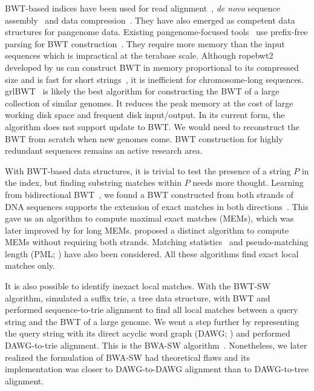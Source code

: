 \documentclass[webpdf,contemporary,large,namedate]{oup-authoring-template}%
\begin{document}
BWT-based indices have been used for read alignment~\citep{Langmead:2009aa,Li:2009uq,Li:2009aa},
\emph{de novo} sequence assembly~\citep{Simpson:2012aa} and data compression~\citep{Cox:2012ly}.
They have also emerged as competent data structures for pangenome data.
Existing pangenome-focused tools~\citep{Rossi:2022aa,Ahmed:2021aa,Zakeri:2024aa}
use prefix-free parsing for BWT construction~\citep{Boucher:2019aa}.
They require more memory than the input sequences which is impractical at the terabase scale.
Although ropebwt2 developed by us can construct BWT in memory proportional to its compressed size and is fast for short strings~\citep{Li:2014ab},
it is inefficient for chromosome-long sequences.
grlBWT~\citep{DBLP:journals/iandc/DiazDominguezN23} is likely the best algorithm for constructing the BWT of a large collection of similar genomes.
It reduces the peak memory at the cost of large working disk space and frequent disk input/output.
In its current form, the algorithm does not support update to BWT.
We would need to reconstruct the BWT from scratch when new genomes come.
BWT construction for highly redundant sequences remains an active research area.

With BWT-based data structures, it is trivial to test the presence of a string $P$ in the index,
but finding substring matches within $P$ needs more thought.
Learning from bidirectional BWT~\citep{DBLP:conf/bibm/LamLTWWY09},
we found a BWT constructed from both strands of DNA sequences supports the extension of exact matches in both directions~\citep{Li:2012fk}.
This gave us an algorithm to compute maximal exact matches (MEMs), which was later improved by \citet{DBLP:conf/dlt/Gagie24} for long MEMs.
\citet{DBLP:journals/tcs/BannaiGI20} proposed a distinct algorithm to compute MEMs without requiring both strands.
Matching statistics~\citep{DBLP:journals/algorithmica/ChangL94} and pseudo-matching length (PML; \citealt*{Ahmed:2021aa}) have also been considered.
All these algorithms find exact local matches only.

It is also possible to identify inexact local matches.
With the BWT-SW algorithm, \citet{Lam:2008aa} simulated a suffix trie, a tree data structure, with BWT
and performed sequence-to-trie alignment to find all local matches
between a query string and the BWT of a large genome.
We went a step further by representing the query string with its direct acyclic word graph (DAWG; \citealt*{DBLP:journals/eatcs/BlumerBEHM83})
and performed DAWG-to-trie alignment.
This is the BWA-SW algorithm~\citep{Li:2010fk}.
Nonetheless, we later realized the formulation of BWA-SW had theoretical flaws
and its implementation was closer to DAWG-to-DAWG alignment than to DAWG-to-tree alignment.
\end{document}
